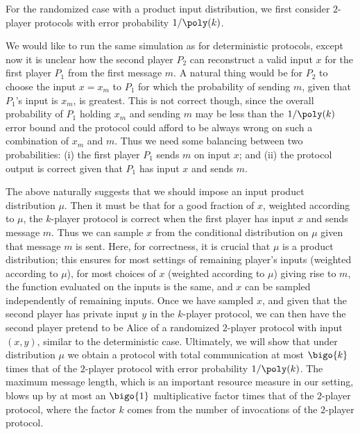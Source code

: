 For the randomized case with a product input distribution, we first consider $2$-player protocols with error probability $1/\poly(k)$. 

We would like to run the same simulation as for deterministic protocols, 
except now it is unclear how the second player $P_2$ can reconstruct a valid input $x$ for the first player $P_1$ from the first message $m$. 
A natural thing would be for $P_2$
to choose the input $x=x_m$ to $P_1$ for which the probability
of sending $m$, given that $P_1$'s input is $x_m$, is greatest. 
This is not correct though, since the overall probability of $P_1$ holding $x_m$ and sending $m$ may be less than the $1/\poly(k)$ error bound  
and the protocol could afford to be always wrong on such a combination of $x_m$ and $m$.
Thus we need some balancing between two probabilities:  
%
(i) %
the first player $P_1$ sends $m$ on input $x$;
and %
(ii)  %
%
%
the protocol output is correct 
given that $P_1$ 
has input $x$ and sends $m$. 

The above naturally suggests that we should impose an
input product distribution $\mu$. Then it must be that for a good
fraction of $x$, weighted according to $\mu$,
the $k$-player protocol is correct when the first player has input $x$ and sends message $m$. 
Thus we can sample $x$ from the conditional distribution on $\mu$
given that message $m$ is sent. Here, for correctness, it is crucial
that $\mu$ is a product distribution; this ensures for most settings of
remaining player's inputs (weighted according to $\mu$), for most choices
of $x$ (weighted according to $\mu$) giving rise to $m$, the function evaluated on the inputs is the same, and $x$ can be sampled independently of remaining inputs. 
Once we have sampled $x$, and given that the second player has private input $y$ in the $k$-player protocol, we can then have
the second player pretend to be Alice of a randomized $2$-player
protocol with input $(x,y)$, similar to the deterministic case. 
Ultimately,  
we will show that under distribution $\mu$ we obtain a protocol with
total communication at most $\bigo{k}$ times that of the 
$2$-player protocol with error probability $1/\poly(k)$. The maximum message length, which is an important resource measure in our setting, blows up by at most an $\bigo{1}$ multiplicative factor times that of the $2$-player
protocol, 
where the factor $k$ comes from 
the number of invocations of the $2$-player protocol. 


